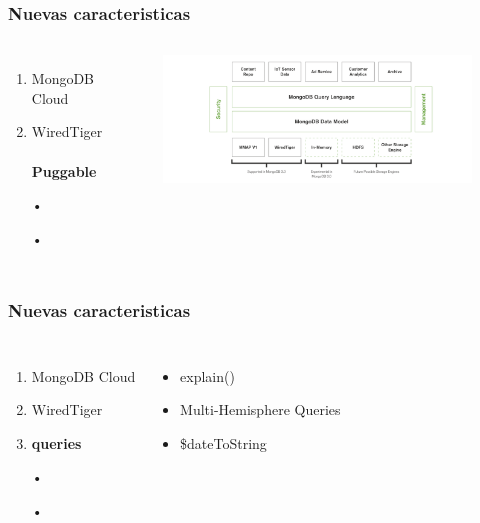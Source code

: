 \documentclass{beamer}
\begin{document}
\begin{frame}
\frametitle{Nuevas caracteristicas}
\begin{columns}[c] %

\begin{enumerate}
\item MongoDB Cloud
\item WiredTiger
\\~\\
\textbf{Puggable}
\item[•]	
\item[•]	
\end{enumerate}

\begin{figure}
\includegraphics[width=1\linewidth]{pluggable.png}
\end{figure}
\end{columns}
\end{frame}

\begin{frame}
\frametitle{Nuevas caracteristicas}
\begin{columns}[c] %

\begin{enumerate}
\item MongoDB Cloud
\item WiredTiger
\item \textbf{queries}
\item[•]	
\item[•]	
\end{enumerate}

\begin{itemize}
\item explain()
\item Multi-Hemisphere Queries
\item \$dateToString
\end{itemize}
\end{columns}
\end{frame}
\end{document}
